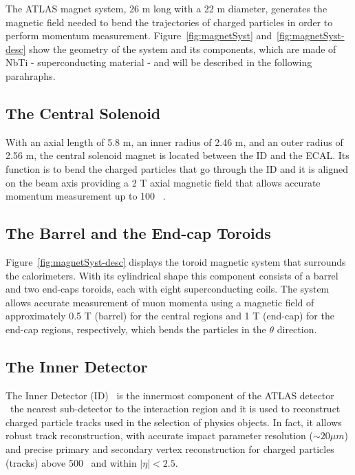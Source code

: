 			\noindent The ATLAS magnet system, 26 m long with a 22 m diameter, generates the magnetic field needed to bend the trajectories of charged particles in order to perform momentum measurement. Figure~\ref{fig:magnetSyst} and~\ref{fig:magnetSyst-desc} show the geometry of the system and its components, which are made of NbTi - superconducting material - and will be described in the following parahraphs. 



			\subsection*{The Central Solenoid}

				With an axial length of 5.8 m, an inner radius of 2.46 m, and an outer radius of 2.56 m, the central solenoid magnet is located between the ID and the ECAL. Its function is to bend the charged particles that go through the ID and it is aligned on the beam axis providing a 2 T axial magnetic field that allows accurate momentum measurement up to 100 \GeV~\cite{YAMAMOTO200853}.

			\subsection*{The Barrel and the End-cap Toroids}

				Figure~\ref{fig:magnetSyst-desc} displays the toroid magnetic system that surrounds the calorimeters. With its cylindrical shape this component consists of a barrel and two end-caps toroids, each with eight superconducting coils. The system allows accurate measurement of muon momenta using a magnetic field of approximately 0.5 T (barrel) for the central regions and 1 T (end-cap) for the end-cap regions, respectively, which bends the particles in the $\theta$ direction.

				
		\subsection{The Inner Detector}
		\label{sec:ID}

			The Inner Detector (ID)~\cite{ATLASInDet} is the innermost component of the ATLAS detector \ie\ the nearest sub-detector to the interaction region and it is used to reconstruct charged particle tracks used in the selection of physics objects. In fact, it allows robust track reconstruction, with accurate impact parameter resolution ($\sim 20 \mu m$) and precise primary and secondary vertex reconstruction for charged particles (tracks) above 500 \MeV\ and within $\displaystyle|\eta| < 2.5$.

